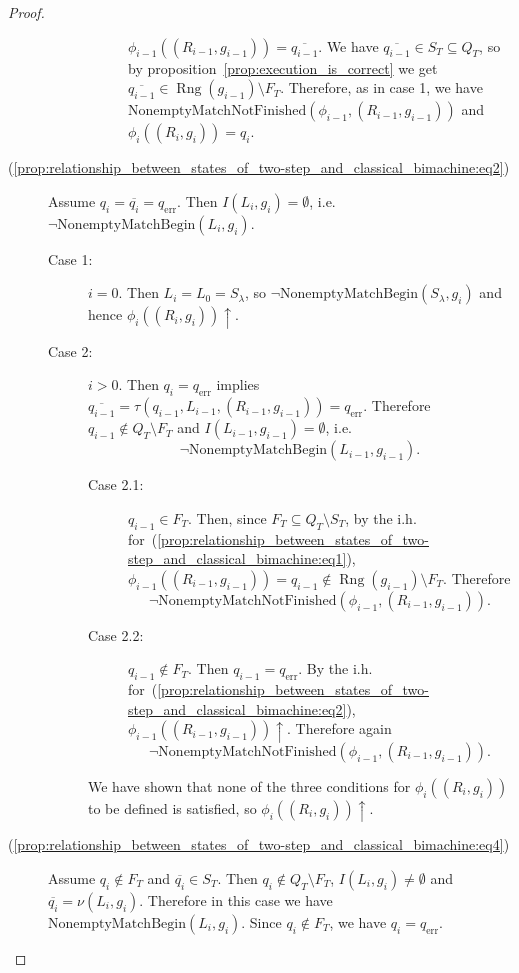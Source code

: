 \documentclass{article}
\DeclareMathOperator{\Rng}{Rng}
\begin{document}
\begin{proof}
\begin{description}
\begin{description}
\begin{description}
						$\phi_{i-1}((R_{i-1}, g_{i-1})) = \overline{q_{i-1}}$.
						We have $\overline{q_{i-1}}\in S_T\subseteq Q_T$, so by proposition~\ref{prop:execution_is_correct} we get $\overline{q_{i-1}}\in \Rng(g_{i-1})\setminus F_T$.
						Therefore, as in case 1, we have $\mathrm{NonemptyMatchNotFinished}(\phi_{i-1}, (R_{i-1}, g_{i-1}))$ and
						$\phi_i((R_i, g_i)) = q_i$.
					\end{description}
				\end{description}
			\item[(\ref{prop:relationship_between_states_of_two-step_and_classical_bimachine:eq2})]
				Assume $q_i = \overline{q_i} = q_\mathrm{err}$. Then $I(L_i, g_i) = \emptyset$, i.e.\ $\lnot\mathrm{NonemptyMatchBegin}(L_i, g_i)$.
				\begin{description}
				\item[Case 1:] $i=0$.
					Then $L_i = L_0 = S_\lambda$, so $\lnot\mathrm{NonemptyMatchBegin}(S_\lambda, g_i)$ and hence $\phi_i((R_i, g_i))\uparrow$.
				\item[Case 2:] $i>0$.
					Then $q_i = q_\mathrm{err}$ implies $\overline{q_{i-1}} = \tau(q_{i-1}, L_{i-1}, (R_{i-1}, g_{i-1})) = q_\mathrm{err}$. Therefore $q_{i-1}\notin Q_T\setminus F_T$ and $I(L_{i-1}, g_{i-1}) = \emptyset$, i.e.
					\[ \lnot\mathrm{NonemptyMatchBegin}(L_{i-1}, g_{i-1}). \]
					\begin{description}
					\item[Case 2.1:] $q_{i-1}\in F_T$.
						Then, since $F_T\subseteq Q_T\setminus S_T$, by the i.h. for~(\ref{prop:relationship_between_states_of_two-step_and_classical_bimachine:eq1}), $\phi_{i-1}((R_{i-1}, g_{i-1})) = q_{i-1}\notin \Rng(g_{i-1})\setminus F_T$. Therefore
						\[ \lnot\mathrm{NonemptyMatchNotFinished}(\phi_{i-1}, (R_{i-1}, g_{i-1})). \]
					\item[Case 2.2:] $q_{i-1}\notin F_T$. Then $q_{i-1} = q_\mathrm{err}$.
						By the i.h. for~(\ref{prop:relationship_between_states_of_two-step_and_classical_bimachine:eq2}), $\phi_{i-1}((R_{i-1}, g_{i-1}))\uparrow$. Therefore again
						\[ \lnot\mathrm{NonemptyMatchNotFinished}(\phi_{i-1}, (R_{i-1}, g_{i-1})). \]
					\end{description}
					We have shown that none of the three conditions for $\phi_i((R_i, g_i))$ to be defined is satisfied, so $\phi_i((R_i, g_i))\uparrow$.
				\end{description}
			\item[(\ref{prop:relationship_between_states_of_two-step_and_classical_bimachine:eq4})]
				Assume $q_i\notin F_T$ and $\overline{q_i}\in S_T$. Then $q_i\notin Q_T\setminus F_T$, $I(L_i, g_i)\ne \emptyset$ and $\overline{q_i} = \nu(L_i, g_i)$. Therefore in this case we have $\mathrm{NonemptyMatchBegin}(L_i, g_i)$. Since $q_i\notin F_T$, we have $q_i = q_\mathrm{err}$.

\end{description}
\end{proof}
\end{document}
